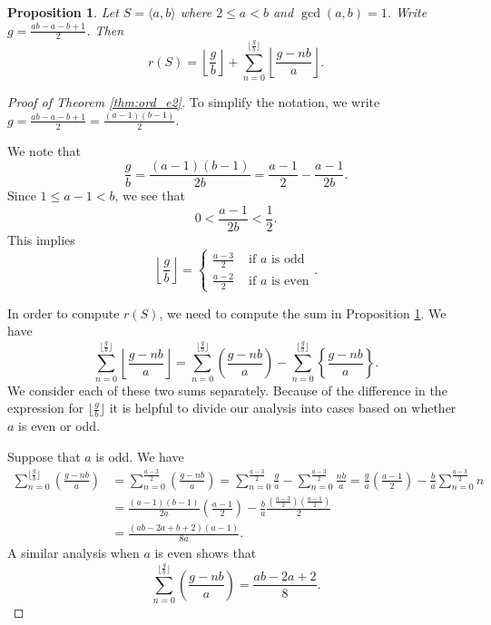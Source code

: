 \documentclass[10pt,a4paper]{amsart}
\newtheorem{prop}{Proposition}
\begin{document}
\begin{prop}\label{2genO}
Let $S = \langle a,b\rangle$ where $2\le a < b$ and $\gcd(a,b) = 1$. Write $g = \frac{ab-a-b+1}{2}$.  Then
\[
r(S) =\left\lfloor\frac{g}{b}\right\rfloor +\sum\limits_{n=0}^{\lfloor\frac{g}{b}\rfloor}\left\lfloor \frac{g-nb}{a}\right\rfloor.
\]
\end{prop}

\begin{proof}[Proof of Theorem \ref{thm:ord_e2}]
To simplify the notation, we write $g = \frac{ab-a-b+1}{2} = \frac{(a-1)(b-1)}{2}$.

We note that 
\[
\frac{g}{b} = \frac{(a-1)(b-1)}{2b} = \frac{a-1}{2}-\frac{a-1}{2b}.
\]
Since $1 \le a-1 < b$, we see that 
\[
0 < \frac{a-1}{2b} < \frac{1}{2}.
\]
This implies 
\begin{equation}\label{eqn:floor}
\left\lfloor \frac{g}{b} \right\rfloor = \begin{cases} \frac{a-3}{2} & \text{ if } a \text{ is odd} \\
\frac{a-2}{2} & \text{ if } a \text{ is even} 
\end{cases}.
\end{equation}

In order to compute $r(S)$, we need to compute the sum in Proposition \ref{2genO}.  We have
\begin{equation}\label{eqn:sums}
\sum_{n=0}^{\lfloor \frac{g}{b}\rfloor} \left\lfloor \frac{g-nb}{a} \right\rfloor = \sum_{n=0}^{\lfloor \frac{g}{b}\rfloor} \left(\frac{g-nb}{a} \right) - \sum_{n=0}^{\lfloor\frac{g}{b}\rfloor} \left\{\frac{g-nb}{a} \right\}.
\end{equation}
We consider each of these two sums separately.  Because of the difference in the expression for $\lfloor \frac{g}{b} \rfloor$ it is helpful to divide our analysis into cases based on whether $a$ is even or odd.

Suppose that $a$ is odd.  We have
\begin{align}
\sum_{n=0}^{\lfloor \frac{g}{b}\rfloor} \left(\frac{g-nb}{a} \right) & =  \sum_{n=0}^{ \frac{a-3}{2}} \left(\frac{g-nb}{a} \right) = \sum_{n=0}^{ \frac{a-3}{2}} \frac{g}{a} - \sum_{n=0}^{ \frac{a-3}{2}} \frac{nb}{a}  =  \frac{g}{a}\left( \frac{a-1}{2}\right) - \frac{b}{a} \sum_{n=0}^{ \frac{a-3}{2}} n \nonumber\\
&  =   \frac{(a-1)(b-1)}{2a} \left( \frac{a-1}{2} \right)- \frac{b}{a} \frac{\left(\frac{a-3}{2}\right) \left(\frac{a-1}{2}\right)}{2} \nonumber \\
& =  \frac{(ab - 2a + b + 2)(a - 1)}{8a}. \label{eqn:main_term_odd}
\end{align}
A similar analysis when $a$ is even shows that 
\begin{equation}\label{eqn:main_term_even}
\sum_{n=0}^{\lfloor \frac{g}{b}\rfloor} \left(\frac{g-nb}{a} \right) = \frac{ab - 2a + 2}{8}.
\end{equation}


\end{proof}
\end{document}
